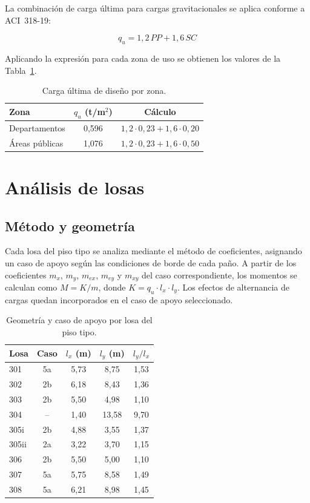 La combinación de carga última para cargas gravitacionales se aplica conforme a ACI~318-19:
 
\begin{equation}
    q_u = 1{,}2\,PP + 1{,}6\,SC
\end{equation}
 
Aplicando la expresión para cada zona de uso se obtienen los valores de la Tabla~\ref{tab:qu}.
 
\begin{table}[h!]
\centering
\caption{Carga última de diseño por zona.}
\label{tab:qu}
\begin{tabular}{lcc}
\toprule
Zona & $q_u$ (t/m$^2$) & Cálculo \\
\midrule
Departamentos    & 0{,}596 & $1{,}2 \cdot 0{,}23 + 1{,}6 \cdot 0{,}20$ \\
Áreas públicas   & 1{,}076 & $1{,}2 \cdot 0{,}23 + 1{,}6 \cdot 0{,}50$ \\
\bottomrule
\end{tabular}
\end{table}
 
\section{Análisis de losas}
\label{sec:analisis-losas}
 
\subsection{Método y geometría}
 
Cada losa del piso tipo se analiza mediante el método de coeficientes, asignando un caso de apoyo según las condiciones de borde de cada paño. A partir de los coeficientes $m_x$, $m_y$, $m_{ex}$, $m_{ey}$ y $m_{xy}$ del caso correspondiente, los momentos se calculan como $M = K/m$, donde $K = q_u \cdot l_x \cdot l_y$. Los efectos de alternancia de cargas quedan incorporados en el caso de apoyo seleccionado.
 
\begin{table}[h!]
\centering
\caption{Geometría y caso de apoyo por losa del piso tipo.}
\label{tab:geometria}
\begin{tabular}{lcccc}
\toprule
Losa & Caso & $l_x$ (m) & $l_y$ (m) & $l_y/l_x$ \\
\midrule
301   & 5a  & 5{,}73 & 8{,}75  & 1{,}53 \\
302   & 2b  & 6{,}18 & 8{,}43  & 1{,}36 \\
303   & 2b  & 5{,}50 & 4{,}98  & 1{,}10 \\
304   & --  & 1{,}40 & 13{,}58 & 9{,}70 \\
305i  & 2b  & 4{,}88 & 3{,}55  & 1{,}37 \\
305ii & 2a  & 3{,}22 & 3{,}70  & 1{,}15 \\
306   & 2b  & 5{,}50 & 5{,}00  & 1{,}10 \\
307   & 5a  & 5{,}75 & 8{,}58  & 1{,}49 \\
308   & 5a  & 6{,}21 & 8{,}98  & 1{,}45 \\
\bottomrule
\end{tabular}
\end{table}
 
